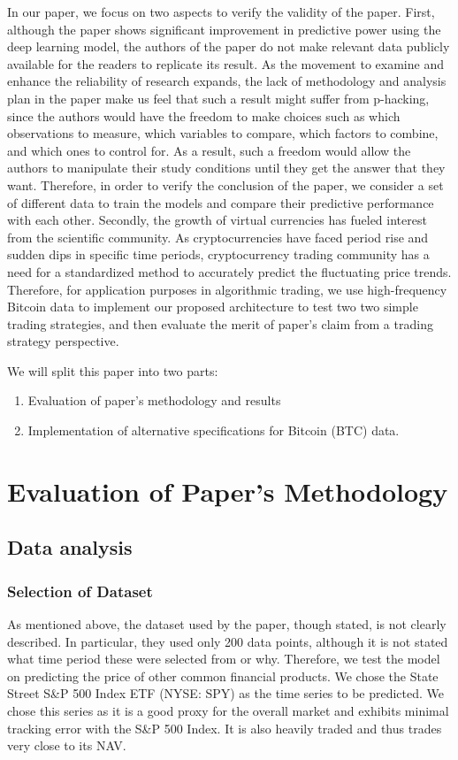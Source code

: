 \documentclass{article}
\begin{document}
In our paper, we focus on two aspects to verify the validity of the paper. First, although the paper shows significant improvement in predictive power using the deep learning model, the authors of the paper do not make relevant data publicly available for the readers to replicate its result. As the movement to examine and enhance the reliability of research expands, the lack of methodology and analysis plan in the paper make us feel that such a result might suffer from p-hacking, since the authors would have the freedom to make choices such as  which observations to measure, which variables to compare, which factors to combine, and which ones to control for. As a result, such a freedom would allow the authors to manipulate their study conditions until they get the answer that they want. Therefore, in order to verify the conclusion of the paper, we consider a set of different data to train the models and compare their predictive performance with each other. Secondly, the growth of virtual currencies has fueled interest from the scientific community. As cryptocurrencies have faced period rise and sudden dips in specific time periods, cryptocurrency trading community has a need for a standardized method to accurately predict the fluctuating price trends. Therefore, for application purposes in algorithmic trading, we use high-frequency Bitcoin data to implement our proposed architecture to test two two simple trading strategies, and then evaluate the merit of paper's claim from a trading strategy perspective.

We will split this paper into two parts:
\begin{enumerate}
  \item Evaluation of paper's methodology and results
  \item Implementation of alternative specifications for Bitcoin (BTC) data.
\end{enumerate}

\section{Evaluation of Paper's Methodology}

\subsection{Data analysis}
\label{sec:headings}

\subsubsection{Selection of Dataset}
As mentioned above, the dataset used by the paper, though stated, is not clearly described. In particular, they used only 200 data points, although it is not stated what time period these were selected from or why. Therefore, we test the model on predicting the price of other common financial products. We chose the State Street S\&P 500 Index ETF (NYSE: SPY) as the time series to be predicted. We chose this series as it is a good proxy for the overall market and exhibits minimal tracking error with the S&P 500 Index. It is also heavily traded and thus trades very close to its NAV.
\end{document}
